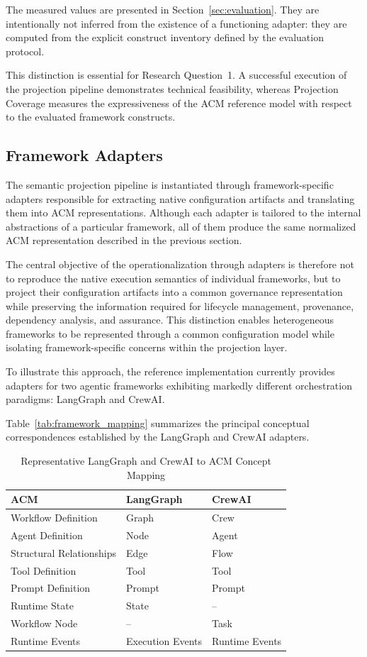 \documentclass[10pt]{article}
\begin{document}
The measured values are presented in
Section~\ref{sec:evaluation}. They are intentionally not inferred from the
existence of a functioning adapter: they are computed from the explicit
construct inventory defined by the evaluation protocol.

This distinction is essential for Research Question~1. A successful execution
of the projection pipeline demonstrates technical feasibility, whereas
Projection Coverage measures the expressiveness of the ACM reference model with
respect to the evaluated framework constructs.

\subsection{Framework Adapters}
\label{sec:framework_adapters}

The semantic projection pipeline is instantiated through framework-specific adapters responsible for extracting native configuration artifacts and translating them into ACM representations. Although each adapter is tailored to the internal abstractions of a particular framework, all of them produce the same normalized ACM representation described in the previous section.

The central objective of the operationalization through adapters is therefore not to reproduce the native execution semantics of individual frameworks, but to project their configuration artifacts into a common governance representation while preserving the information required for lifecycle management, provenance, dependency analysis, and assurance. This distinction enables heterogeneous frameworks to be represented through a common configuration model while isolating framework-specific concerns within the projection layer.

To illustrate this approach, the reference implementation currently provides adapters for two agentic frameworks exhibiting markedly different orchestration paradigms: LangGraph and CrewAI.

Table~\ref{tab:framework_mapping} summarizes the principal conceptual correspondences established by the LangGraph and CrewAI adapters.

\begin{table}[ht]
\centering
\caption{Representative LangGraph and CrewAI to ACM Concept Mapping}
\label{tab:langgraph_mapping}
\begin{tabular}{lll}
	\toprule
	\textbf{ACM} & \textbf{LangGraph} & \textbf{CrewAI} \\
	\midrule
	Workflow Definition & Graph & Crew \\
	Agent Definition & Node &  Agent \\
	Structural Relationships & Edge &  Flow\\
	Tool Definition & Tool & Tool \\
	Prompt Definition & Prompt & Prompt\\
	Runtime State & State & -- \\
	Workflow Node & -- & Task \\
	Runtime Events & Execution Events & Runtime Events \\
	\bottomrule
\end{tabular}
\end{table}
\end{document}
